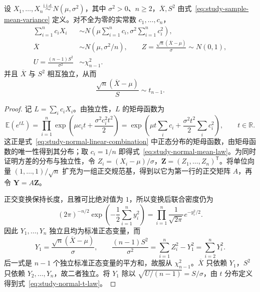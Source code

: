 \begin{theorem}[正态样本的基本抽样分布]
\label{thm:study-normal-sampling}
设 $X_1,\ldots,X_n\overset{\mathrm{i.i.d.}}{\sim}N(\mu,\sigma^2)$，其中 $\sigma^2>0$、$n\ge2$，$\overline X,S^2$ 由式~\eqref{eq:study-sample-mean-variance} 定义。对不全为零的实常数 $c_1,\ldots,c_n$，
\begin{align}
  \sum_{i=1}^{n}c_iX_i
    &\sim N\left(\mu\sum_{i=1}^{n}c_i,
                  \sigma^2\sum_{i=1}^{n}c_i^2\right),
       \label{eq:study-normal-linear-combination}\\
  \overline X&\sim N(\mu,\sigma^2/n),
  \qquad Z=\frac{\sqrt n(\overline X-\mu)}{\sigma}\sim N(0,1),
       \label{eq:study-normal-mean-law}\\
  U=\frac{(n-1)S^2}{\sigma^2}&\sim\chi^2_{n-1}.
       \label{eq:study-normal-variance-law}
\end{align}
并且 $\overline X$ 与 $S^2$ 相互独立，从而
\begin{equation}
  \frac{\sqrt n(\overline X-\mu)}{S}\sim t_{n-1}.
  \label{eq:study-normal-t-law}
\end{equation}
\end{theorem}

\begin{proof}
记 $L=\sum_i c_iX_i$。由独立性，$L$ 的矩母函数为
\[
  \mathbb E(e^{tL})
  =\prod_{i=1}^{n}\exp\left(\mu c_it+\frac{\sigma^2c_i^2t^2}{2}\right)
  =\exp\left(\mu t\sum_i c_i+\frac{\sigma^2t^2}{2}\sum_i c_i^2\right),
  \qquad t\in\mathbb R.
\]
这正是式~\eqref{eq:study-normal-linear-combination} 中正态分布的矩母函数，由矩母函数的唯一性得到其分布；取 $c_i=1/n$ 即得式~\eqref{eq:study-normal-mean-law}。为同时证明方差的分布与独立性，令 $Z_i=(X_i-\mu)/\sigma$，$\boldsymbol Z=(Z_1,\ldots,Z_n)^{\mathsf T}$。将单位向量 $(1,\ldots,1)/\sqrt n$ 扩充为一组正交规范基，得到以它为第一行的正交矩阵 $A$，再令 $\boldsymbol Y=A\boldsymbol Z$。

正交变换保持长度，且雅可比绝对值为 $1$，所以变换后联合密度仍为
\[
  (2\pi)^{-n/2}\exp\left(-\frac12\sum_{i=1}^{n}y_i^2\right)
  =\prod_{i=1}^{n}\frac1{\sqrt{2\pi}}e^{-y_i^2/2}.
\]
因此 $Y_1,\ldots,Y_n$ 独立且均为标准正态变量，而
\[
  Y_1=\frac{\sqrt n(\overline X-\mu)}\sigma,\qquad
  \frac{(n-1)S^2}{\sigma^2}
    =\sum_{i=1}^{n}Z_i^2-Y_1^2
    =\sum_{i=2}^{n}Y_i^2.
\]
后一式是 $n-1$ 个独立标准正态变量的平方和，故服从 $\chi^2_{n-1}$。$\overline X$ 只依赖 $Y_1$，$S^2$ 只依赖 $Y_2,\ldots,Y_n$，故二者独立。将 $Y_1$ 除以 $\sqrt{U/(n-1)}=S/\sigma$，由 $t$ 分布定义得到式~\eqref{eq:study-normal-t-law}。
\end{proof}

